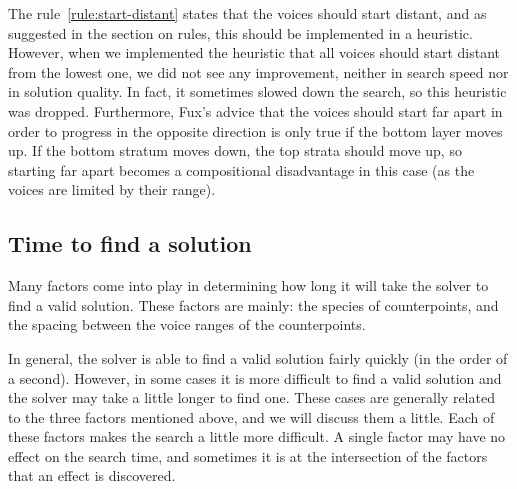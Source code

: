 The rule~\ref{rule:start-distant} states that the voices should start distant, and as suggested in the section on rules, this should be implemented in a heuristic. However, when we implemented the heuristic that all voices should start distant from the lowest one, we did not see any improvement, neither in search speed nor in solution quality. In fact, it sometimes slowed down the search, so this heuristic was dropped. Furthermore, Fux's advice that the voices should start far apart in order to progress in the opposite direction is only true if the bottom layer moves up. If the bottom stratum moves down, the top strata should move up, so starting far apart becomes a compositional disadvantage in this case (as the voices are limited by their range).



\subsection{Time to find a solution} \label{section:time-to-find-a-solution}
Many factors come into play in determining how long it will take the solver to find a valid solution. These factors are mainly: the species of counterpoints, and the spacing between the voice ranges of the counterpoints.


In general, the solver is able to find a valid solution fairly quickly (in the order of a second). However, in some cases it is more difficult to find a valid solution and the solver may take a little longer to find one. These cases are generally related to the three factors mentioned above, and we will discuss them a little. Each of these factors makes the search a little more difficult. A single factor may have no effect on the search time, and sometimes it is at the intersection of the factors that an effect is discovered.

